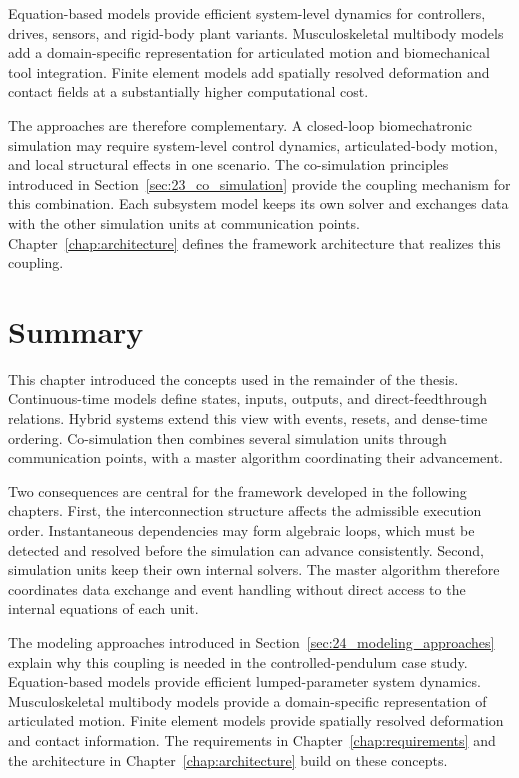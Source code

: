 Equation-based models provide efficient system-level dynamics for controllers, drives, sensors, and rigid-body plant variants.
Musculoskeletal multibody models add a domain-specific representation for articulated motion and biomechanical tool integration.
Finite element models add spatially resolved deformation and contact fields at a substantially higher computational cost.

The approaches are therefore complementary.
A closed-loop biomechatronic simulation may require system-level control dynamics, articulated-body motion, and local structural effects in one scenario.
The co-simulation principles introduced in Section~\ref{sec:23_co_simulation} provide the coupling mechanism for this combination.
Each subsystem model keeps its own solver and exchanges data with the other simulation units at communication points.
Chapter~\ref{chap:architecture} defines the framework architecture that realizes this coupling.

\section*{Summary}

This chapter introduced the concepts used in the remainder of the thesis.
Continuous-time models define states, inputs, outputs, and direct-feedthrough relations.
Hybrid systems extend this view with events, resets, and dense-time ordering.
Co-simulation then combines several simulation units through communication points, with a master algorithm coordinating their advancement.

Two consequences are central for the framework developed in the following chapters.
First, the interconnection structure affects the admissible execution order.
Instantaneous dependencies may form algebraic loops, which must be detected and resolved before the simulation can advance consistently.
Second, simulation units keep their own internal solvers.
The master algorithm therefore coordinates data exchange and event handling without direct access to the internal equations of each unit.

The modeling approaches introduced in Section~\ref{sec:24_modeling_approaches} explain why this coupling is needed in the controlled-pendulum case study.
Equation-based models provide efficient lumped-parameter system dynamics.
Musculoskeletal multibody models provide a domain-specific representation of articulated motion.
Finite element models provide spatially resolved deformation and contact information.
The requirements in Chapter~\ref{chap:requirements} and the architecture in Chapter~\ref{chap:architecture} build on these concepts.